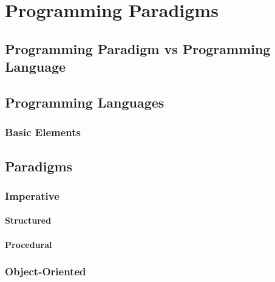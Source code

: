 \chapter{Programming Paradigms}


\section{Programming Paradigm vs Programming Language}


\section{Programming Languages}


\subsection{Basic Elements}


\section{Paradigms}


\subsection{Imperative}


\subsubsection{Structured}


\subsubsection{Procedural}


\subsection{Object-Oriented}

